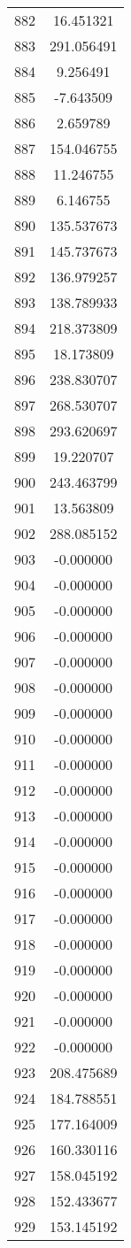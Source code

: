 \documentclass[12pt]{article}
\begin{document}
\begin{longtable}{@{}cc@{}}
882 & 16.451321 \\
883 & 291.056491 \\
884 & 9.256491 \\
885 & -7.643509 \\
886 & 2.659789 \\
887 & 154.046755 \\
888 & 11.246755 \\
889 & 6.146755 \\
890 & 135.537673 \\
891 & 145.737673 \\
892 & 136.979257 \\
893 & 138.789933 \\
894 & 218.373809 \\
895 & 18.173809 \\
896 & 238.830707 \\
897 & 268.530707 \\
898 & 293.620697 \\
899 & 19.220707 \\
900 & 243.463799 \\
901 & 13.563809 \\
902 & 288.085152 \\
903 & -0.000000 \\
904 & -0.000000 \\
905 & -0.000000 \\
906 & -0.000000 \\
907 & -0.000000 \\
908 & -0.000000 \\
909 & -0.000000 \\
910 & -0.000000 \\
911 & -0.000000 \\
912 & -0.000000 \\
913 & -0.000000 \\
914 & -0.000000 \\
915 & -0.000000 \\
916 & -0.000000 \\
917 & -0.000000 \\
918 & -0.000000 \\
919 & -0.000000 \\
920 & -0.000000 \\
921 & -0.000000 \\
922 & -0.000000 \\
923 & 208.475689 \\
924 & 184.788551 \\
925 & 177.164009 \\
926 & 160.330116 \\
927 & 158.045192 \\
928 & 152.433677 \\
929 & 153.145192 \\

\end{longtable}
\end{document}
